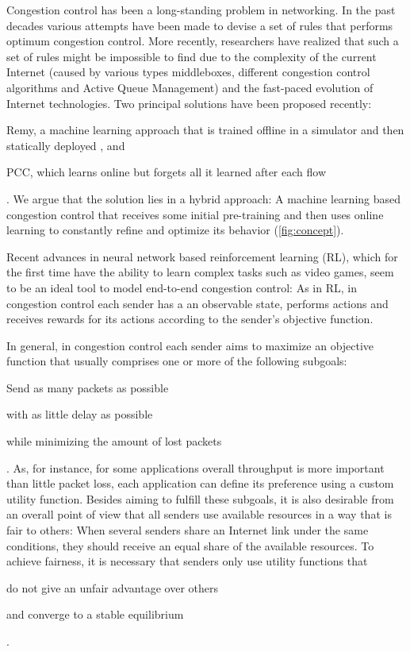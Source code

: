 \documentclass[10pt,sigconf,anonymous]{acmart}
\begin{document}
Congestion control has been a long-standing problem in networking. In the past decades various attempts have been made to devise a set of rules that performs optimum congestion control. More recently, researchers have realized that such a set of rules might be impossible to find due to the complexity of the current Internet (caused by various types middleboxes, different congestion control algorithms and Active Queue Management) and the fast-paced evolution of Internet technologies. Two principal solutions have been proposed recently: \begin{enumerate*}
\item Remy, a machine learning approach that is trained offline in a simulator and then statically deployed \cite{winstein_tcp_2013}, and \item PCC, which learns online but forgets all it learned after each flow \cite{dong_pcc:_2015} \end{enumerate*}. We argue that the solution lies in a hybrid approach: A machine learning based congestion control that receives some initial pre-training and then uses online learning to constantly refine and optimize its behavior (\autoref{fig:concept}). 

Recent advances in neural network based reinforcement learning (RL), which for the first time have the ability to learn complex tasks such as video games, seem to be an ideal tool to model end-to-end congestion control: As in RL, in congestion control each sender has a an observable state, performs actions and receives rewards for its actions according to the sender's objective function.

In general, in congestion control each sender aims to maximize an objective function that usually comprises one or more of the following subgoals:
\begin{enumerate*}
\item Send as many packets as possible
\item with as little delay as possible
\item while minimizing the amount of lost packets
\end{enumerate*}. 
As, for instance, for some applications overall throughput is more important than little packet loss, each application can define its preference using a custom utility function. Besides aiming to fulfill these subgoals, it is also desirable from an overall point of view that all senders use available resources in a way that is fair to others: When several senders share an Internet link under the same conditions, they should receive an equal share of the available resources. To achieve fairness, it is necessary that senders only use utility functions that 
\begin{enumerate*}
\item do not give an unfair advantage over others
\item and converge to a stable equilibrium
\end{enumerate*}.
\end{document}
